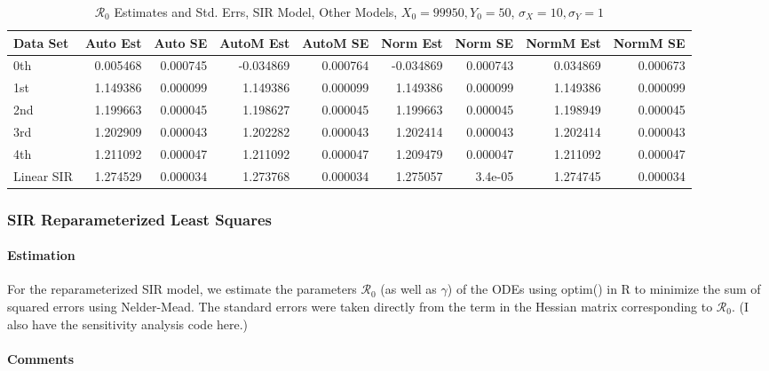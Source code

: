 \documentclass[12pt]{article}
\newcommand{\rr}{\ensuremath{\mathcal{R}_0}}
\begin{document}
\begin{table}[H]
	
	\caption{$\rr$ Estimates and Std. Errs, SIR Model,
		Other Models, $X_0 = 99950, Y_0 = 50$, 
		$\sigma_X = 10, \sigma_Y = 1$}
	\begin{footnotesize}
		\hskip -1cm
		\begin{tabular}{l|r|r|r|r|r|r|r|r}
			\hline
			Data Set & Auto Est & Auto SE & AutoM Est & AutoM SE & Norm Est & Norm SE & NormM Est & NormM SE\\
			\hline
			0th & 0.005468 & 0.000745 & -0.034869 & 0.000764 & -0.034869 & 0.000743 & 0.034869 & 0.000673\\
			\hline
			1st & 1.149386 & 0.000099 & 1.149386 & 0.000099 & 1.149386 & 0.000099 & 1.149386 & 0.000099\\
			\hline
			2nd & 1.199663 & 0.000045 & 1.198627 & 0.000045 & 1.199663 & 0.000045 & 1.198949 & 0.000045\\
			\hline
			3rd & 1.202909 & 0.000043 & 1.202282 & 0.000043 & 1.202414 & 0.000043 & 1.202414 & 0.000043\\
			\hline
			4th & 1.211092 & 0.000047 & 1.211092 & 0.000047 & 1.209479 & 0.000047 & 1.211092 & 0.000047\\
			\hline
			Linear SIR & 1.274529 & 0.000034 & 1.273768 & 0.000034 & 1.275057 & 3.4e-05 & 1.274745 & 0.000034\\
			\hline
		\end{tabular}
	\end{footnotesize}
\end{table}

\subsubsection{SIR Reparameterized Least Squares}

\paragraph{Estimation}

For the reparameterized SIR model, we estimate the parameters $\rr$ (as well as $\gamma$) of the ODEs using optim() in R to minimize the sum of squared errors using Nelder-Mead. The standard errors were taken directly from the term in the Hessian matrix corresponding to $\rr$. (I also have the sensitivity analysis code here.)

\paragraph{Comments}
\end{document}
